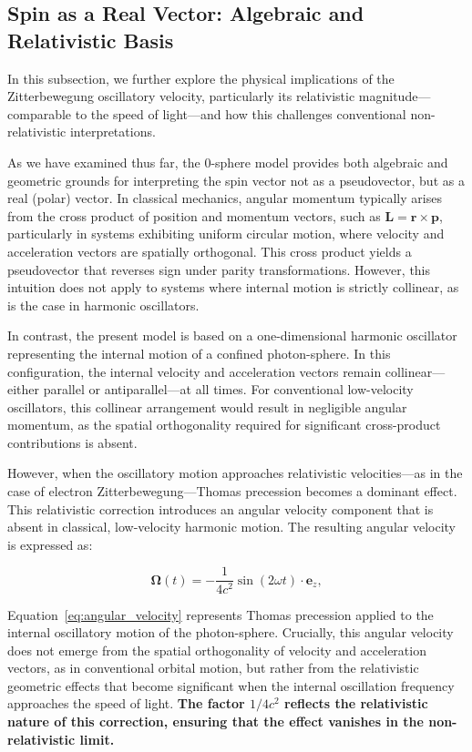 \documentclass[%
 reprint,
 amsmath,amssymb,
 aps,
]{revtex4-1}
\numberwithin{equation}{section}%
\begin{document}
\subsection{Spin as a Real Vector: Algebraic and Relativistic Basis}

In this subsection, we further explore the physical implications of the Zitterbewegung oscillatory velocity, particularly its relativistic magnitude—comparable to the speed of light—and how this challenges conventional non-relativistic interpretations.

As we have examined thus far, the 0-sphere model provides both algebraic and geometric grounds for interpreting the spin vector not as a pseudovector, but as a real (polar) vector. In classical mechanics, angular momentum typically arises from the cross product of position and momentum vectors, such as $\boldsymbol{L} = \boldsymbol{r} \times \boldsymbol{p}$, particularly in systems exhibiting uniform circular motion, where velocity and acceleration vectors are spatially orthogonal. This cross product yields a pseudovector that reverses sign under parity transformations. However, this intuition does not apply to systems where internal motion is strictly collinear, as is the case in harmonic oscillators.

In contrast, the present model is based on a one-dimensional harmonic oscillator representing the internal motion of a confined photon-sphere. In this configuration, the internal velocity and acceleration vectors remain collinear—either parallel or antiparallel—at all times. For conventional low-velocity oscillators, this collinear arrangement would result in negligible angular momentum, as the spatial orthogonality required for significant cross-product contributions is absent.

However, when the oscillatory motion approaches relativistic velocities—as in the case of electron Zitterbewegung—Thomas precession becomes a dominant effect. This relativistic correction introduces an angular velocity component that is absent in classical, low-velocity harmonic motion. The resulting angular velocity is expressed as:

\begin{equation}
    \boldsymbol{\Omega}(t) = -\frac{1}{4c^2} \sin(2\omega t) \cdot \boldsymbol{e}_z,
    \label{eq:angular_velocity}
\end{equation}

Equation~\ref{eq:angular_velocity} represents Thomas precession applied to the internal oscillatory motion of the photon-sphere. Crucially, this angular velocity does not emerge from the spatial orthogonality of velocity and acceleration vectors, as in conventional orbital motion, but rather from the relativistic geometric effects that become significant when the internal oscillation frequency approaches the speed of light. \textbf{The factor $1/4c^2$ reflects the relativistic nature of this correction, ensuring that the effect vanishes in the non-relativistic limit.}
\end{document}
